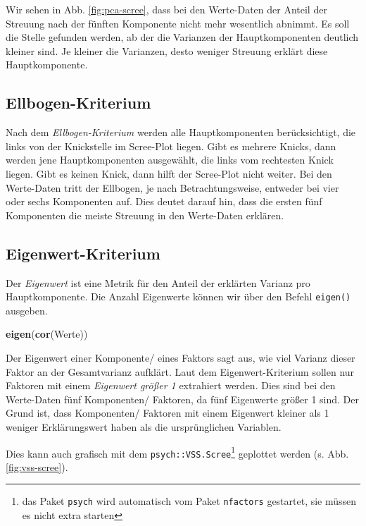 \documentclass[12pt,ngerman,]{book}
\makeatletter
\newenvironment{Shaded}{\begin{snugshade}}{\end{snugshade}}
\newcommand{\KeywordTok}[1]{\textcolor[rgb]{0.13,0.29,0.53}{\textbf{#1}}}
\newcommand{\NormalTok}[1]{#1}
\let\rmarkdownfootnote\footnote%
\def\footnote{\protect\rmarkdownfootnote}
\newenvironment{kframe}{%
\medskip{}
\setlength{\fboxsep}{.8em}
 \def\at@end@of@kframe{}%
 \ifinner\ifhmode%
  \def\at@end@of@kframe{\end{minipage}}%
  \begin{minipage}{\columnwidth}%
 \fi\fi%
 \def\FrameCommand##1{\hskip\@totalleftmargin \hskip-\fboxsep
 \colorbox{shadecolor}{##1}\hskip-\fboxsep
     \hskip-\linewidth \hskip-\@totalleftmargin \hskip\columnwidth}%
 \MakeFramed {\advance\hsize-\width
   \@totalleftmargin\z@ \linewidth\hsize
   \@setminipage}}%
 {\par\unskip\endMakeFramed%
 \at@end@of@kframe}
\renewenvironment{Shaded}{\begin{kframe}}{\end{kframe}}
\theoremstyle{definition}
\theoremstyle{definition}
\theoremstyle{remark}
\makeatother
\begin{document}
Wir sehen in Abb. \ref{fig:pca-scree}, dass bei den Werte-Daten der
Anteil der Streuung nach der fünften Komponente nicht mehr wesentlich
abnimmt. Es soll die Stelle gefunden werden, ab der die Varianzen der
Hauptkomponenten deutlich kleiner sind. Je kleiner die Varianzen, desto
weniger Streuung erklärt diese Hauptkomponente.

\subsection{Ellbogen-Kriterium}\label{ellbogen-kriterium}

Nach dem \emph{Ellbogen-Kriterium} werden alle
Hauptkomponenten berücksichtigt, die links von der Knickstelle im
Scree-Plot liegen. Gibt es mehrere Knicks, dann werden jene
Hauptkomponenten ausgewählt, die links vom rechtesten Knick liegen. Gibt
es keinen Knick, dann hilft der Scree-Plot nicht weiter. Bei den
Werte-Daten tritt der Ellbogen, je nach Betrachtungsweise, entweder bei
vier oder sechs Komponenten auf. Dies deutet darauf hin, dass die ersten
fünf Komponenten die meiste Streuung in den Werte-Daten erklären.

\subsection{Eigenwert-Kriterium}\label{eigenwert-kriterium}

Der \emph{Eigenwert} ist eine Metrik für den Anteil der
erklärten Varianz pro Hauptkomponente. Die Anzahl Eigenwerte können wir
über den Befehl \texttt{eigen()} ausgeben.

\begin{Shaded}
\begin{Highlighting}[]
\KeywordTok{eigen}\NormalTok{(}\KeywordTok{cor}\NormalTok{(Werte))}
\end{Highlighting}
\end{Shaded}

Der Eigenwert einer Komponente/ eines Faktors sagt aus, wie viel Varianz
dieser Faktor an der Gesamtvarianz aufklärt. Laut dem
Eigenwert-Kriterium sollen nur Faktoren mit einem \emph{Eigenwert größer
1} extrahiert werden. Dies sind bei den Werte-Daten fünf Komponenten/
Faktoren, da fünf Eigenwerte größer 1 sind. Der Grund ist, dass
Komponenten/ Faktoren mit einem Eigenwert kleiner als 1 weniger
Erklärungswert haben als die ursprünglichen Variablen.

Dies kann auch grafisch mit dem \texttt{psych::VSS.Scree}\footnote{das
  Paket \texttt{psych} wird automatisch vom Paket \texttt{nfactors}
  gestartet, sie müssen es nicht extra starten} geplottet werden (s.
Abb. \ref{fig:vss-scree}).
\end{document}
